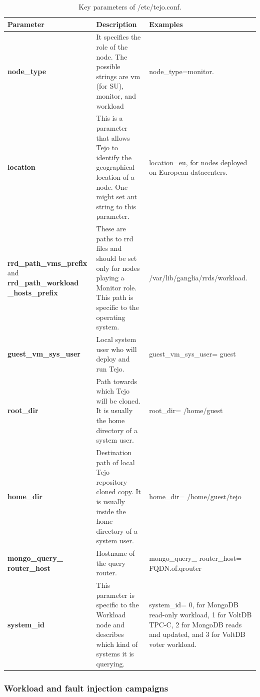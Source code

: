 			\begin{table}[htdp]
				\begin{center}
\caption{Key parameters of /etc/tejo.conf.}
  \label{tab:common_install_conf_kp}
					\begin{tabular}{R{4cm} || L{6cm} L{3cm} }
						{\bf Parameter}&{\bf Description}&{\bf Examples} \\  
						\hline
						\hline
						{\bf node\_type}&It specifies the role of the node. The possible strings are vm (for SU), monitor, and workload & node\_type=monitor. \\
						\hline
						{\bf location}&This is a parameter that allows Tejo to identify the geographical location of a node. One might set ant string to this parameter. & location=eu, for nodes deployed on European datacenters. \\
						\hline
						{\bf rrd\_path\_vms\_prefix} and {\bf rrd\_path\_workload \_hosts\_prefix}&These are paths to rrd files and should be set only for nodes playing a Monitor role. This path is specific to the operating system. & /var/lib/ganglia/rrds/workload. \\
						\hline
						{\bf guest\_vm\_sys\_user} &Local system user who will deploy and run Tejo.&guest\_vm\_sys\_user= guest\\
						\hline
						{\bf root\_dir} &Path towards which Tejo will be cloned. It is usually the home directory of a system user.&root\_dir= /home/guest\\
						\hline
						{\bf home\_dir} &Destination path of local Tejo repository cloned copy. It is usually inside the home directory of a system user.&home\_dir= /home/guest/tejo\\
						\hline
						{\bf mongo\_query\_ router\_host} &Hostname of the query router.&mongo\_query\_ router\_host= FQDN.of.qrouter\\
						\hline
						{\bf system\_id} &This parameter is specific to the Workload node and describes which kind of systems it is querying.&system\_id= 0, for MongoDB read-only workload, 1 for VoltDB TPC-C, 2 for MongoDB reads and updated, and 3 for VoltDB voter workload.\\
					\end{tabular}
				\end{center}
			\end{table}

\subsubsection{Workload and fault injection campaigns}

